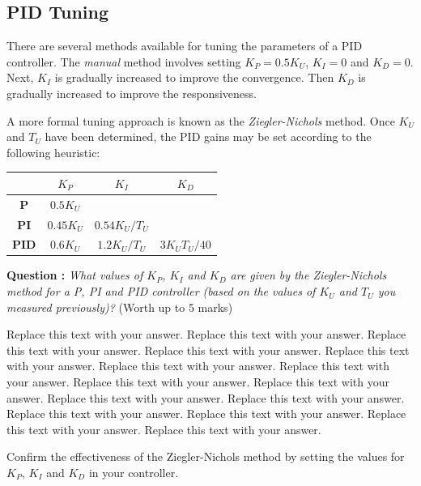 \documentclass[hidelinks,a4paper,11pt]{article}
\newcounter{question}
\newcommand\myq{\refstepcounter{question}\thequestion}
\begin{document}
\subsection {PID Tuning}

There are several methods available for tuning the parameters of a PID controller.  The \emph{manual} method involves setting $K_P=0.5K_U$, $K_I=0$ and $K_D=0$.  Next, $K_I$ is gradually increased to improve the convergence.  Then $K_D$ is gradually increased to improve the responsiveness.

A more formal tuning approach is known as the \emph{Ziegler-Nichols} method.  Once $K_U$ and $T_U$ have been determined, the PID gains may be set according to the following heuristic:
\begin{center}
	\begin{tabular}{ | c | c | c | c | } \hline
		 & \bf{$K_P$} & \bf{$K_I$} & \bf{$K_D$} \\ \hline
		\bf{P} & $0.5K_U$ &  &  \\ \hline
		\bf{PI} & $0.45K_U$ & $0.54K_U/T_U$ &  \\ \hline
		\bf{PID} & $0.6K_U$ & $1.2K_U/T_U$ & $3K_UT_U/40$ \\ \hline
	\end{tabular}
\end{center}
\vspace*{\baselineskip}

{\bfseries Question \myq:}  \emph{What values of $K_P$, $K_I$ and $K_D$ are given by the Ziegler-Nichols method for a P, PI and PID controller (based on the values of $K_U$ and $T_U$ you measured previously)?} (Worth up to 5 marks)\\
\begin{mdframed}
Replace this text with your answer.  Replace this text with your answer.  Replace this text with your answer.  Replace this text with your answer.  Replace this text with your answer.  Replace this text with your answer.  Replace this text with your answer.  Replace this text with your answer.  Replace this text with your answer.  Replace this text with your answer.  Replace this text with your answer.  Replace this text with your answer.  Replace this text with your answer.  Replace this text with your answer.  Replace this text with your answer.
\end{mdframed}
\vspace*{\baselineskip}

\begin{todolist}
	\item Confirm the effectiveness of the Ziegler-Nichols method by setting the values for $K_P$, $K_I$ and $K_D$ in your controller.
 \end{todolist}
\end{document}
